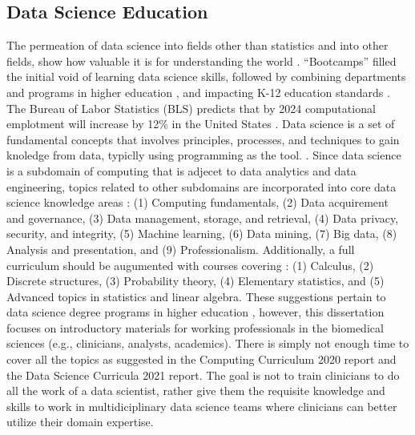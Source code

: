 \documentclass[010-intro.tex]{subfiles}
\begin{document}
\subsection{Data Science Education}

    The permeation of data science into fields other than statistics and into other fields,
    show how valuable it is for understanding the world
    \cite{clevelandDataScienceAction2001}.
    ``Bootcamps'' filled the initial void of learning data science skills,
    followed by combining departments and programs in higher education
    \cite{krossDemocratizationDataScience2020},
    and impacting K-12 education standards
    \cite{csta}.
    The Bureau of Labor Statistics (BLS) predicts that by 2024 computational emplotment will increase by 12\% in the United States
    \cite{cc2020}. %
    Data science is a set of fundamental concepts that involves
    principles, processes, and techniques to gain knoledge from data, typiclly using programming as the tool.
    \cite{cc2020, ccdsc2021, provostDataScienceBusiness2013}.
    Since data science is a subdomain of computing that is adjecet to data analytics and data engineering,
    topics related to other subdomains are incorporated into core data science knowledge areas \cite{cc2020, ccdsc2021}:
    (1) Computing fundamentals,
    (2) Data acquirement and governance,
    (3) Data management, storage, and retrieval,
    (4) Data privacy, security, and integrity,
    (5) Machine learning,
    (6) Data mining,
    (7) Big data,
    (8) Analysis and presentation, and
    (9) Professionalism.
    Additionally, a full curriculum should be augumented with courses covering \cite{cc2020, ccdsc2021}:
    (1) Calculus,
    (2) Discrete structures,
    (3) Probability theory,
    (4) Elementary statistics, and
    (5) Advanced topics in statistics and linear algebra.
    These suggestions pertain to data science degree programs in higher education \cite{cc2020, ccdsc2021},
    however, this dissertation focuses on introductory materials for working professionals in the biomedical sciences
    (e.g., clinicians, analysts, academics).
    There is simply not enough time to cover all the topics as suggested in the
    Computing Curriculum 2020 report and the Data Science Curricula 2021 report.
    The goal is not to train clinicians to do all the work of a data scientist,
    rather give them the requisite knowledge and skills to work in multidiciplinary data science teams
    where clinicians can better utilize their domain expertise.
\end{document}
